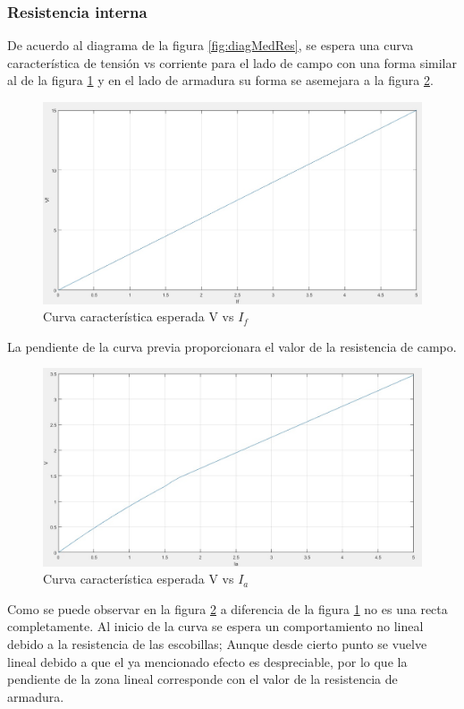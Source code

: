 \documentclass[11pt,letterpaper]{article}     %
\begin{document}
\subsubsection{Resistencia interna }
De acuerdo al diagrama de la figura \ref{fig:diagMedRes}, se espera una curva característica de tensión vs corriente para el lado de campo con una forma similar al de la figura \ref{fig:curvaCaractPreVILadoCampo} y en el lado de armadura su forma se asemejara a la figura \ref{fig:curvaCaractPreVILadoArmadura}.
\begin{figure}[H]
    \centering
    \includegraphics[scale=0.5]{./recursos-Lab6/curvaCaractPreVILadoCampo.jpg}
    \caption{Curva característica esperada V vs $I_{f}$}
    \label{fig:curvaCaractPreVILadoCampo}
\end{figure}
La pendiente de la curva previa proporcionara el valor de la resistencia de campo.
\begin{figure}[H]
    \centering
    \includegraphics[scale=0.5]{./recursos-Lab6/curvaCaractPreVILadoArmadura.jpg}
    \caption{Curva característica esperada V vs $I_{a}$}
    \label{fig:curvaCaractPreVILadoArmadura}
\end{figure} 
Como se puede observar en la figura \ref{fig:curvaCaractPreVILadoArmadura} a diferencia de la figura \ref{fig:curvaCaractPreVILadoCampo} no es una recta completamente. Al inicio de la curva se espera un comportamiento no lineal debido a la resistencia de las escobillas; Aunque desde cierto punto se vuelve lineal debido a que el ya mencionado efecto es despreciable, por lo que la pendiente de la zona lineal corresponde con el valor de la resistencia de armadura. 
\end{document}
